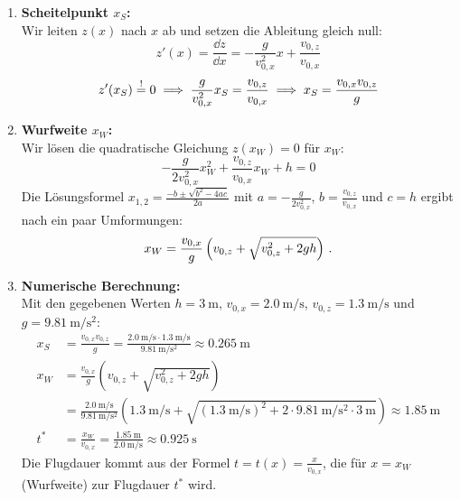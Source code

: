 \documentclass[ngerman]{scrreprt}
\newenvironment{loesungbox}[1]
  {\needspace{5\baselineskip}\begin{loesungboxstyle}[frametitle={#1}]}
  {\end{loesungboxstyle}}
\begin{document}
\begin{loesungbox}{Lösung zu \Cref{aufg:schraeger_wurf}}
\begin{enumerate}
    \item \textbf{Scheitelpunkt $x_S$:} \\
    Wir leiten $z(x)$ nach $x$ ab und setzen die Ableitung gleich null: 
    \begin{equation}
        z'(x) = \frac{\dd z}{\dd x} = -\frac{g}{v_{0,x}^2}x + \frac{v_{0,z}}{v_{0,x}} \label{eq: wurfparabel_abl}
    \end{equation}
    \begin{equation}
        z'(x_S) \stackrel{!}{=} 0 \implies \frac{g}{v_{0,x}^2}x_S = \frac{v_{0,z}}{v_{0,x}} \implies x_S = \frac{v_{0,x}v_{0,z}}{g} \label{eq: scheitelpunkt_xs}
    \end{equation}
    
    \item \textbf{Wurfweite $x_W$:} \\
    Wir lösen die quadratische Gleichung $z(x_W)=0$ für $x_W$:
    \begin{equation}
        -\frac{g}{2v_{0,x}^2}x_W^2 + \frac{v_{0,z}}{v_{0,x}}x_W + h = 0
    \end{equation}
    Die Lösungsformel $x_{1,2} = \frac{-b \pm \sqrt{b^2-4ac}}{2a}$ mit $a=-\frac{g}{2v_{0,x}^2}$, $b=\frac{v_{0,z}}{v_{0,x}}$ und $c=h$ ergibt nach ein paar Umformungen:
    \begin{equation}\label{eq: wurfweite_xw}
        x_W = \frac{v_{0,x}}{g}\left(v_{0,z} + \sqrt{v_{0,z}^2 + 2gh}\right) \,.
    \end{equation}
    
    \item \textbf{Numerische Berechnung:} \\
    Mit den gegebenen Werten $h=\SI{3}{\meter}$, $v_{0,x}=\SI{2.0}{\meter\per\second}$, $v_{0,z}=\SI{1.3}{\meter\per\second}$ und $g=\SI{9.81}{\meter\per\second\squared}$:
    \begin{align*}
        x_S &= \frac{v_{0,x}v_{0,z}}{g} = \frac{\SI{2.0}{\meter\per\second} \cdot \SI{1.3}{\meter\per\second}}{\SI{9.81}{\meter\per\second\squared}} \approx \SI{0.265}{\meter} \\ 
        x_W &= \frac{v_{0,x}}{g}\left(v_{0,z} + \sqrt{v_{0,z}^2 + 2gh}\right) \\
        & = \frac{\SI{2.0}{\meter\per\second}}{\SI{9.81}{\meter\per\second\squared}}\left(\SI{1.3}{\meter\per\second} + \sqrt{(\SI{1.3}{\meter\per\second})^2 + 2 \cdot \SI{9.81}{\meter\per\second\squared} \cdot \SI{3}{\meter}}\right) \approx \SI{1.85}{\meter} \\ 
        t^* &= \frac{x_W}{v_{0,x}} = \frac{\SI{1.85}{\meter}}{\SI{2.0}{\meter\per\second}} \approx \SI{0.925}{\second} 
    \end{align*}
    Die Flugdauer kommt aus der Formel $t = t(x) = \frac{x}{v_{0,x}}$, die für $x = x_W$ (Wurfweite) zur Flugdauer $t^*$ wird.
\end{enumerate}
\end{loesungbox}
\end{document}
